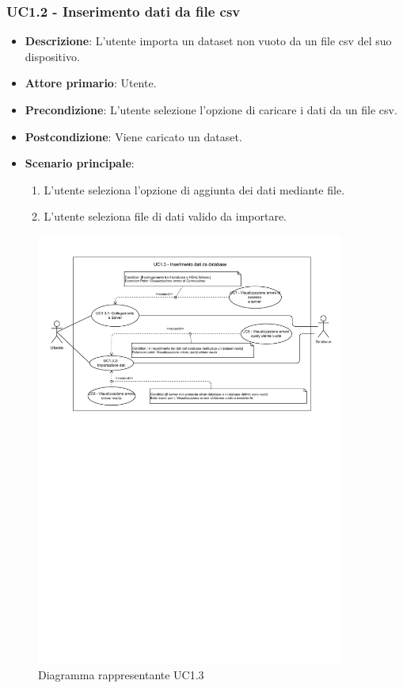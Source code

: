 \subsubsection{UC1.2 - Inserimento dati da file csv}
\label{ssub:uc1.2}
\begin{itemize}
    \item \textbf{Descrizione}: L'utente importa un dataset non vuoto da un file csv del suo dispositivo.

    \item \textbf{Attore primario}: Utente.
    
    \item \textbf{Precondizione}:   L'utente selezione l'opzione di caricare i dati da un file csv.
    \item \textbf{Postcondizione}:  Viene caricato un dataset. 

	\item \textbf{Scenario principale}:
		\begin{enumerate}
			\item L'utente seleziona l'opzione di aggiunta dei dati mediante file.
			\item L'utente seleziona file di dati valido da importare.
        \end{enumerate}
     
\end{itemize}

\newpage
\begin{figure}[h]
    \centering
    \includegraphics[width=0.9\textwidth]{componenti/casi-duso/diagrammi/UC1_3.pdf}
    \caption{Diagramma rappresentante UC1.3}
    \label{fig:UC1.3}
\end{figure}


